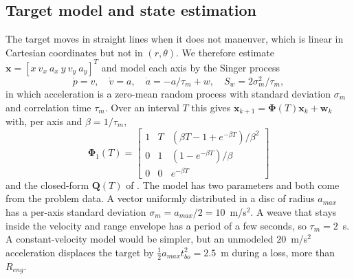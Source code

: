 \documentclass[conference]{IEEEtran}
\newcommand{\sm}{\sigma_m}
\newcommand{\Reng}{R_{eng}}
\begin{document}
\subsection{Target model and state estimation}
The target moves in straight lines when it does not maneuver, which is linear in Cartesian coordinates but not in $(r,\theta)$. We therefore estimate $\mathbf x=[x\ v_x\ a_x\ y\ v_y\ a_y]^T$ and model each axis by the Singer process \cite{singer,lijilkov}
\begin{equation}
\dot p=v,\quad \dot v=a,\quad \dot a=-a/\tau_m+w,\quad S_w=2\sm^2/\tau_m ,
\end{equation}
in which acceleration is a zero-mean random process with standard deviation $\sm$ and correlation time $\tau_m$. Over an interval $T$ this gives $\mathbf x_{k+1}=\bm\Phi(T)\mathbf x_k+\mathbf w_k$ with, per axis and $\beta=1/\tau_m$,
\begin{equation}
\bm\Phi_1(T)=\begin{bmatrix}1&T&(\beta T-1+e^{-\beta T})/\beta^2\\0&1&(1-e^{-\beta T})/\beta\\0&0&e^{-\beta T}\end{bmatrix}
\label{eq:Phi}
\end{equation}
and the closed-form $\mathbf Q(T)$ of \cite{singer}. The model has two parameters and both come from the problem data. A vector uniformly distributed in a disc of radius $a_{max}$ has a per-axis standard deviation $\sm=a_{max}/2=10$~m/s$^2$. A weave that stays inside the velocity and range envelope has a period of a few seconds, so $\tau_m=2$~s. A constant-velocity model would be simpler, but an unmodeled $20$~m/s$^2$ acceleration displaces the target by $\tfrac12a_{max}t_{bo}^2=2.5$~m during a loss, more than $\Reng$.
\end{document}
